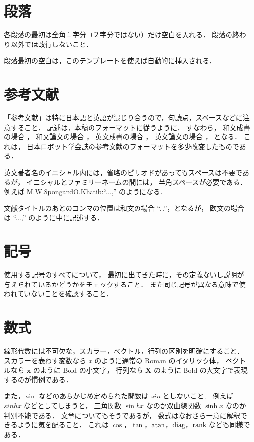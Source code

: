 \section{段落}

各段落の最初は全角１字分（２字分ではない）だけ空白を入れる．
段落の終わり以外では改行しないこと．

段落最初の空白は，このテンプレートを使えば自動的に挿入される．


\section{参考文献}

「参考文献」は特に日本語と英語が混じり合うので，句読点，スペースなどに注意すること．
記述は，本稿のフォーマットに従うように．
すなわち，
和文成書の場合 \Cite{jbook}，
和文論文の場合 \Cite{jpaper}，
英文成書の場合 \Cite{ebook}，
英文論文の場合 \Cite{epaper}，
となる．
これは，
日本ロボット学会誌の参考文献のフォーマットを多少改変したものである．

英文著者名のイニシャル内には，省略のピリオドがあってもスペースは不要であるが，
イニシャルとファミリーネームの間には，
半角スペースが必要である．
例えば M.W.{\textvisiblespace}Spong{\textvisiblespace}and{\textvisiblespace}O.{\textvisiblespace}Khatib:{\textvisiblespace}``...,'' のようになる．

文献タイトルのあとのコンマの位置は和文の場合 ``...''，となるが，
欧文の場合は ``...,'' のように中に記述する．


\section{記号}

使用する記号のすべてについて，
最初に出てきた時に，その定義ないし説明が与えられているかどうかをチェックすること．
また同じ記号が異なる意味で使われていないことを確認すること．


\section{数式}

線形代数には不可欠な，スカラー，ベクトル，行列の区別を明確にすること．
スカラーを表わす変数なら $x$ のように通常の Roman のイタリック体，
ベクトルなら $\bm{x}$ のように Bold の小文字，
行列なら $\bm{X}$ のように Bold の大文字で表現するのが慣例である．

また，$\sin$ などのあらかじめ定められた関数は $sin$ としないこと．
例えば $sinhx$ などとしてしまうと，
三角関数 $\sin hx$ なのか双曲線関数 $\sinh x$ なのか判別不能である．
文章についてもそうであるが，
数式はなおさら一意に解釈できるように気を配ること．
これは $\cos$，$\tan$，$\mathop{\textrm{atan}}\nolimits$，$\mathop{\textrm{diag}}\nolimits$，$\mathop{\textrm{rank}}\nolimits$ なども同様である．

